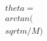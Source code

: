\documentclass[preview]{standalone}
\begin{document}
\begin{align*}
\quad\\theta = \quad\\arctan(\quad\\sqrt{m/M})
\end{align*}
\end{document}
